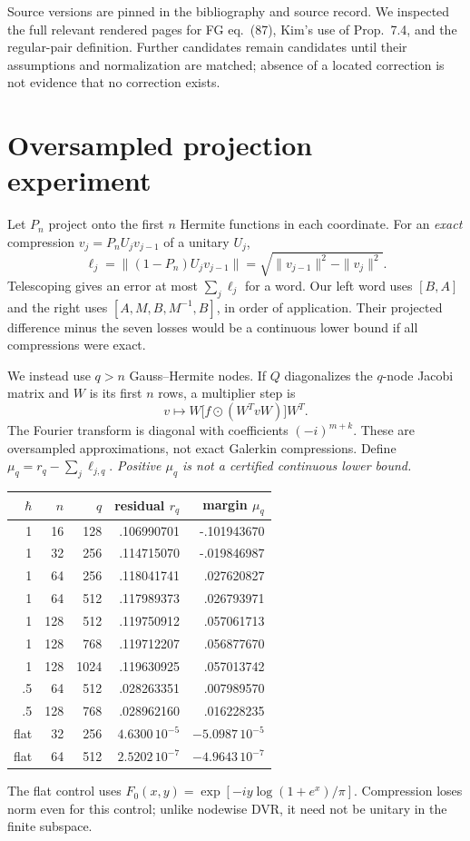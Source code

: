 \documentclass[11pt,a4paper]{article}
\begin{document}
Source versions are pinned in the bibliography and source record.
We inspected the full relevant rendered pages for FG eq.~(87), Kim's
use of Prop.~7.4, and the regular-pair definition.
Further candidates remain candidates until their assumptions and
normalization are matched; absence of a located correction is not
evidence that no correction exists.

\newpage
\section{Oversampled projection experiment}
Let $P_n$ project onto the first $n$ Hermite functions in each coordinate.
For an \emph{exact} compression $v_j=P_nU_jv_{j-1}$ of a unitary $U_j$,
\[
 \ell_j=\|(1-P_n)U_jv_{j-1}\|
       =\sqrt{\|v_{j-1}\|^2-\|v_j\|^2}.
\]
Telescoping gives an error at most $\sum_j\ell_j$ for a word.
Our left word uses $[B,A]$ and the right uses
$[A,M,B,M^{-1},B]$, in order of application.
Their projected difference minus the seven losses would be a continuous
lower bound if all compressions were exact.

We instead use $q>n$ Gauss--Hermite nodes. If $Q$ diagonalizes the $q$-node
Jacobi matrix and $W$ is its first $n$ rows, a multiplier step is
\[
 v\longmapsto W\bigl[f\odot(W^TvW)\bigr]W^T.
\]
The Fourier transform is diagonal with coefficients $(-i)^{m+k}$.
These are oversampled approximations, not exact Galerkin compressions.
Define $\mu_q=r_q-\sum_j\ell_{j,q}$.
\emph{Positive $\mu_q$ is not a certified continuous lower bound.}

\begin{center}\small
\begin{tabular}{rrrrr}
\toprule
$\hbar$ & $n$ & $q$ & residual $r_q$ & margin $\mu_q$\\
\midrule
1 &16&128& .106990701&-.101943670\\
1 &32&256& .114715070&-.019846987\\
1 &64&256& .118041741& .027620827\\
1 &64&512& .117989373& .026793971\\
1 &128&512& .119750912& .057061713\\
1 &128&768& .119712207& .056877670\\
1 &128&1024& .119630925& .057013742\\
.5&64&512& .028263351& .007989570\\
.5&128&768& .028962160& .016228235\\
flat&32&256& $4.6300\,10^{-5}$& $-5.0987\,10^{-5}$\\
flat&64&512& $2.5202\,10^{-7}$& $-4.9643\,10^{-7}$\\
\bottomrule
\end{tabular}
\end{center}
The flat control uses $F_0(x,y)=\exp[-iy\log(1+e^x)/\pi]$.
Compression loses norm even for this control; unlike nodewise DVR,
it need not be unitary in the finite subspace.
\end{document}
